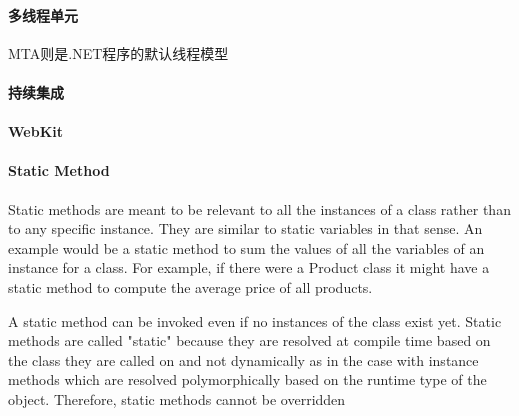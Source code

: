 \documentclass{book}
\begin{document}
\paragraph{多线程单元}MTA则是.NET程序的默认线程模型   

\paragraph{持续集成}

\paragraph{WebKit}

\paragraph{Static Method}

Static methods are meant to be relevant to all the instances of a class rather than to any specific instance. They are similar to static variables in that sense. An example would be a static method to sum the values of all the variables of an instance for a class. For example, if there were a Product class it might have a static method to compute the average price of all products.

A static method can be invoked even if no instances of the class exist yet. Static methods are called "static" because they are resolved at compile time based on the class they are called on and not dynamically as in the case with instance methods which are resolved polymorphically based on the runtime type of the object. Therefore, static methods cannot be overridden
\end{document}
